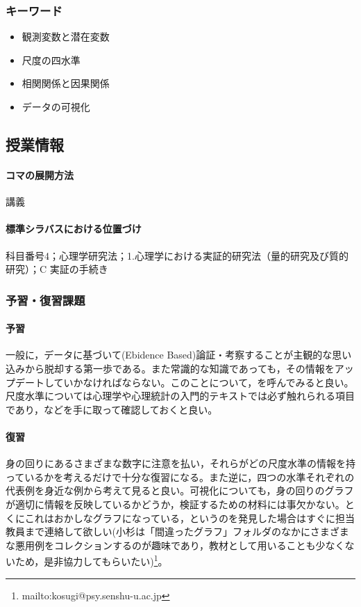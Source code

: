 \subsubsection{キーワード}
\begin{itemize}
	\item 観測変数と潜在変数
	\item 尺度の四水準
	\item 相関関係と因果関係
	\item データの可視化
\end{itemize}
\subsection{授業情報}
\paragraph{コマの展開方法}
講義
\paragraph{標準シラバスにおける位置づけ}
科目番号4；心理学研究法；1.心理学における実証的研究法（量的研究及び質的研究）；C 実証の手続き
\subsubsection{予習・復習課題}
\paragraph{予習}
一般に，データに基づいて(Ebidence Based)論証・考察することが主観的な思い込みから脱却する第一歩である。また常識的な知識であっても，その情報をアップデートしていかなければならない。このことについて，\textcite{Rosling2019}を呼んでみると良い。尺度水準については心理学や心理統計の入門的テキストでは必ず触れられる項目であり，\textcite{Miura201705,Kawabata201408,Yamada2004,kosugi2018,kosugi2019}などを手に取って確認しておくと良い。
\paragraph{復習}
身の回りにあるさまざまな数字に注意を払い，それらがどの尺度水準の情報を持っているかを考えるだけで十分な復習になる。また逆に，四つの水準それぞれの代表例を身近な例から考えて見ると良い。可視化についても，身の回りのグラフが適切に情報を反映しているかどうか，検証するための材料には事欠かない。とくにこれはおかしなグラフになっている，というのを発見した場合はすぐに担当教員まで連絡して欲しい(小杉は「間違ったグラフ」フォルダのなかにさまざまな悪用例をコレクションするのが趣味であり，教材として用いることも少なくないため，是非協力してもらいたい)\footnote{mailto:kosugi@psy.senshu-u.ac.jp}。
